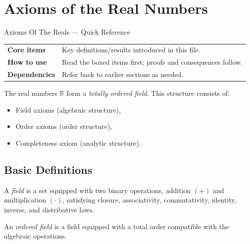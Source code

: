 
\section{Axioms of the Real Numbers}

\begin{toolkitbox}{Axioms Of The Reals — Quick Reference}
\begin{tabular}{@{}p{}p{}@{}}
\textbf{Core items} & Key definitions/results introduced in this file.\\
\textbf{How to use} & Read the boxed items first; proofs and consequences follow.\\
\textbf{Dependencies} & Refer back to earlier sections as needed.\\
\end{tabular}
\end{toolkitbox}


\begin{exposition}
The real numbers $\mathbb{R}$ form a \emph{totally ordered field}.
This structure consists of:
\end{exposition}

\begin{itemize}
\item Field axioms (algebraic structure),
\item Order axioms (order structure),
\item Completeness axiom (analytic structure).
\end{itemize}

\subsection*{Basic Definitions}

\begin{remark*}
A \emph{field} is a set equipped with two binary operations,
addition $(+)$ and multiplication $(\cdot)$,
satisfying closure, associativity, commutativity,
identity, inverse, and distributive laws.

An \emph{ordered field} is a field equipped with a total order
compatible with the algebraic operations.
\end{remark*}

